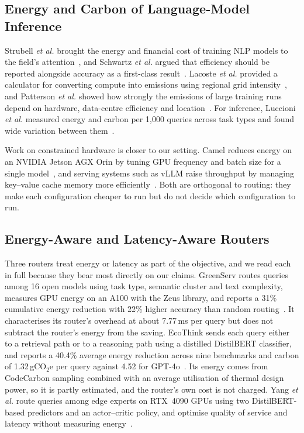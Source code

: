 \subsection{Energy and Carbon of Language-Model Inference}
\label{sec:lit-energy}

Strubell \emph{et al.} brought the energy and financial cost of training NLP
models to the field's attention~\cite{strubell2019energy}, and Schwartz
\emph{et al.} argued that efficiency should be reported alongside accuracy
as a first-class result~\cite{schwartz2020greenai}. Lacoste \emph{et al.}
provided a calculator for converting compute into emissions using regional
grid intensity~\cite{lacoste2019quantifying}, and Patterson \emph{et al.}
showed how strongly the emissions of large training runs depend on
hardware, data-centre efficiency and location~\cite{patterson2021carbon}.
For inference, Luccioni \emph{et al.} measured energy and carbon per
1{,}000 queries across task types and found wide variation between
them~\cite{luccioni2024powerhungry}.

Work on constrained hardware is closer to our setting. Camel reduces energy
on an NVIDIA Jetson AGX Orin by tuning GPU frequency and batch size for a
single model~\cite{xu2025camel}, and serving systems such as vLLM raise
throughput by managing key--value cache memory more
efficiently~\cite{kwon2023vllm}. Both are orthogonal to routing: they make
each configuration cheaper to run but do not decide which configuration to
run.

\subsection{Energy-Aware and Latency-Aware Routers}
\label{sec:lit-energy-routing}

Three routers treat energy or latency as part of the objective, and we read
each in full because they bear most directly on our claims. GreenServ routes
queries among 16 open models using task type, semantic cluster and text
complexity, measures GPU energy on an A100 with the Zeus library, and reports
a 31\% cumulative energy reduction with 22\% higher accuracy than random
routing~\cite{ziller2026greenserv}. It characterises its router's overhead
at about 7.77\,ms per query but does not subtract the router's energy from
the saving. EcoThink sends each query either to a retrieval path or to a
reasoning path using a distilled DistilBERT classifier, and reports a 40.4\%
average energy reduction across nine benchmarks and carbon of
1.32\,gCO$_2$e per query against 4.52 for GPT-4o~\cite{li2026ecothink}. Its
energy comes from CodeCarbon sampling combined with an average utilisation
of thermal design power, so it is partly estimated, and the router's own
cost is not charged. Yang \emph{et al.} route queries among edge experts on
RTX~4090 GPUs using two DistilBERT-based predictors and an actor--critic
policy, and optimise quality of service and latency without measuring
energy~\cite{yang2025qosrouting}.

